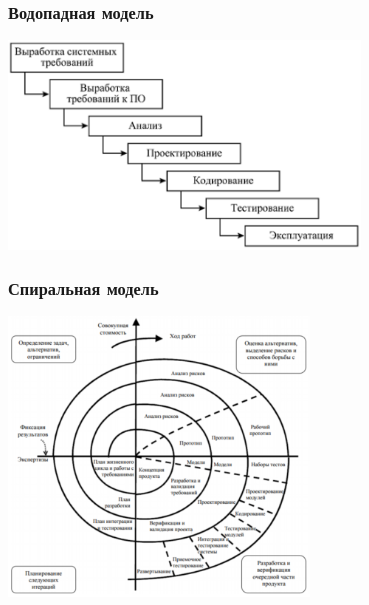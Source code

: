 \documentclass{../../slides-style}
\begin{document}
    \begin{frame}
        \frametitle{Водопадная модель}
        \begin{center}
            \includegraphics[width=0.7\textwidth]{waterfall-model.png}
        \end{center}
    \end{frame}

    \begin{frame}
        \frametitle{Спиральная модель}
        \begin{center}
            \includegraphics[width=0.6\textwidth]{spiral-model.png}
        \end{center}
    \end{frame}
\end{document}
